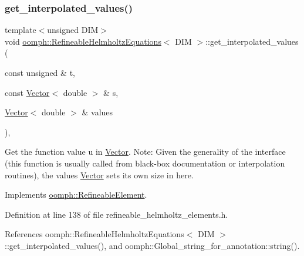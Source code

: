 \subsubsection{\texorpdfstring{get\+\_\+interpolated\+\_\+values()}{get\_interpolated\_values()}\hspace{0.1cm}{\footnotesize\ttfamily [2/2]}}
{\footnotesize\ttfamily template$<$unsigned D\+IM$>$ \\
void \hyperlink{classoomph_1_1RefineableHelmholtzEquations}{oomph\+::\+Refineable\+Helmholtz\+Equations}$<$ D\+IM $>$\+::get\+\_\+interpolated\+\_\+values (\begin{DoxyParamCaption}\item[{const unsigned \&}]{t,  }\item[{const \hyperlink{classoomph_1_1Vector}{Vector}$<$ double $>$ \&}]{s,  }\item[{\hyperlink{classoomph_1_1Vector}{Vector}$<$ double $>$ \&}]{values }\end{DoxyParamCaption})\hspace{0.3cm}{\ttfamily [inline]}, {\ttfamily [virtual]}}



Get the function value u in \hyperlink{classoomph_1_1Vector}{Vector}. Note\+: Given the generality of the interface (this function is usually called from black-\/box documentation or interpolation routines), the values \hyperlink{classoomph_1_1Vector}{Vector} sets its own size in here. 



Implements \hyperlink{classoomph_1_1RefineableElement_ada6f0efe831ffefb1d2829ce01d45bfc}{oomph\+::\+Refineable\+Element}.



Definition at line 138 of file refineable\+\_\+helmholtz\+\_\+elements.\+h.



References oomph\+::\+Refineable\+Helmholtz\+Equations$<$ D\+I\+M $>$\+::get\+\_\+interpolated\+\_\+values(), and oomph\+::\+Global\+\_\+string\+\_\+for\+\_\+annotation\+::string().

\mbox{\label{classoomph_1_1RefineableHelmholtzEquations_ae3981b8ad03d951b0d661d223ad8e560}} 
